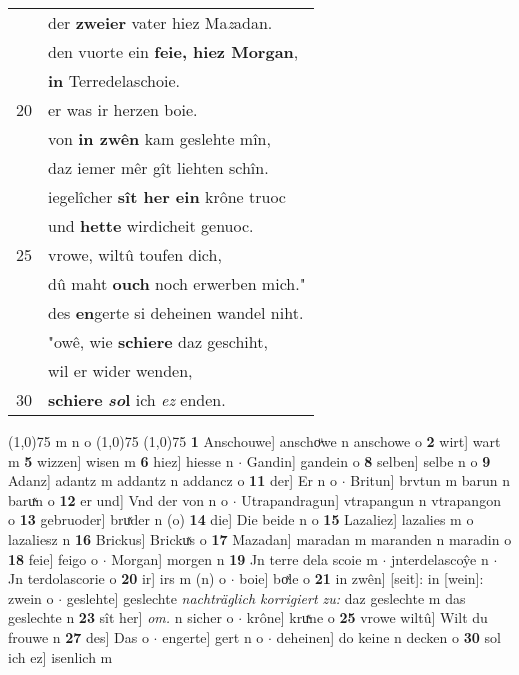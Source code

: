 \documentclass[8pt,a4paper,notitlepage]{article}
\begin{document}
\begin{table}[ht]
\begin{minipage}[t]{0.5\linewidth}
\begin{tabular}{rl}
 & der \textbf{zweier} vater hiez Ma\textit{z}adan.\\ 
 & den vuorte ein \textbf{feie, hiez Morgan},\\ 
 & \textbf{in} Terredelaschoie.\\ 
20 & er was ir herzen boie.\\ 
 & von \textbf{in zwên} kam geslehte mîn,\\ 
 & daz iemer mêr gît liehten schîn.\\ 
 & iegelîcher \textbf{sît her ein} krône truoc\\ 
 & und \textbf{hette} wirdicheit genuoc.\\ 
25 & vrowe, wiltû toufen dich,\\ 
 & dû maht \textbf{ouch} noch erwerben mich."\\ 
 & des \textbf{en}gerte si deheinen wandel niht.\\ 
 & "owê, wie \textbf{schiere} daz geschiht,\\ 
 & wil er wider wenden,\\ 
30 & \textbf{schiere} \textbf{\textit{so}l} ich \textit{ez} enden.\\ 
\end{tabular}
\scriptsize
\line(1,0){75} \newline
m n o \newline
\line(1,0){75} \newline
\newline
\line(1,0){75} \newline
\textbf{1} Anschouwe] anschoͧwe n anschowe o \textbf{2} wirt] wart m \textbf{5} wizzen] wisen m \textbf{6} hiez] hiesse n  $\cdot$ Gandin] gandein o \textbf{8} selben] selbe n o \textbf{9} Adanz] adantz m addantz n addancz o \textbf{11} der] Er n o  $\cdot$ Britun] brvtun m barun n baruͯn o \textbf{12} er und] Vnd der von n o  $\cdot$ Utrapandragun] vtrapangun n vtrapangon o \textbf{13} gebruoder] bruͯder n (o) \textbf{14} die] Die beide n o \textbf{15} Lazaliez] lazalies m o lazaliesz n \textbf{16} Brickus] Brickuͯs o \textbf{17} Mazadan] maradan m maranden n maradin o \textbf{18} feie] feigo o  $\cdot$ Morgan] morgen n \textbf{19} Jn terre dela scoie m  $\cdot$ jnterdelascoŷe n  $\cdot$ Jn terdolascorie o \textbf{20} ir] irs m (n) o  $\cdot$ boie] boͯle o \textbf{21} in zwên] [seit]: in [wein]: zwein o  $\cdot$ geslehte] geslechte \textit{nachträglich korrigiert zu:} daz geslechte m das geslechte n \textbf{23} sît her] \textit{om.} n sicher o  $\cdot$ krône] kruͯne o \textbf{25} vrowe wiltû] Wilt du frouwe n \textbf{27} des] Das o  $\cdot$ engerte] gert n o  $\cdot$ deheinen] do keine n decken o \textbf{30} sol ich ez] isenlich m \newline
\end{minipage}
\end{table}
\end{document}
